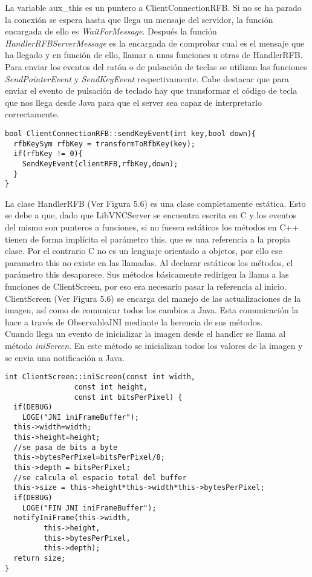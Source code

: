 La variable aux\_this es un puntero a ClientConnectionRFB. Si no se ha parado la conexión se espera hasta que llega un mensaje del servidor, la función encargada de ello es \emph{WaitForMessage}. Después la función \emph{HandlerRFBServerMessage} es la encargada de comprobar cual es el mensaje que ha llegado y en función de ello, llamar a unas funciones u otras de HandlerRFB.\\

Para enviar los eventos del ratón o de pulsación de teclas se utilizan las funciones \emph{SendPointerEvent} y \emph{SendKeyEvent} respectivamente. Cabe destacar que para enviar el evento de pulsación de teclado hay que transformar el código de tecla que nos llega desde Java para que el server sea capaz de interpretarlo correctamente.
\begin{lstlisting}
bool ClientConnectionRFB::sendKeyEvent(int key,bool down){
  rfbKeySym rfbKey = transformToRfbKey(key);
  if(rfbKey != 0){
    SendKeyEvent(clientRFB,rfbKey,down);
  }
}
\end{lstlisting}

La clase HandlerRFB (Ver Figura 5.6) es una clase completamente estática. Esto se debe a que, dado que LibVNCServer se encuentra escrita en C y los eventos del mismo son punteros a funciones, si no fuesen estáticos los métodos en C++ tienen de forma implícita el parámetro this, que es una referencia a la propia clase. Por el contrario C no es un lenguaje orientado a objetos, por ello ese parametro this no existe en las llamadas. Al declarar estáticos los métodos, el parámetro this desaparece. Sus métodos básicamente redirigen la llama a las funciones de ClientScreen, por eso era necesario pasar la referencia al inicio.\\

ClientScreen (Ver Figura 5.6) se encarga del manejo de las actualizaciones de la imagen, así como de comunicar todos los cambios a Java. Esta comunicación la hace a través de ObservableJNI mediante la herencia de sus métodos.\\

Cuando llega un evento de inicializar la imagen desde el handler se llama al método \emph{iniScreen}. En este método se inicializan todos los valores de la imagen y se envia una notificación a Java.
\begin{lstlisting}
int ClientScreen::iniScreen(const int width,
			    const int height,
			    const int bitsPerPixel) {
  if(DEBUG)
    LOGE("JNI iniFrameBuffer");
  this->width=width;
  this->height=height;
  //se pasa de bits a byte
  this->bytesPerPixel=bitsPerPixel/8;
  this->depth = bitsPerPixel;
  //se calcula el espacio total del buffer
  this->size = this->height*this->width*this->bytesPerPixel;
  if(DEBUG)
    LOGE("FIN JNI iniFrameBuffer");
  notifyIniFrame(this->width,
		 this->height,
		 this->bytesPerPixel,
		 this->depth);
  return size;
}
\end{lstlisting}

